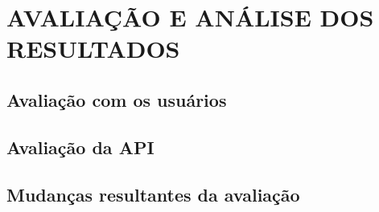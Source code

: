 \chapter{AVALIAÇÃO E ANÁLISE DOS RESULTADOS}
\label{chap:analise}

\section{Avaliação com os usuários}
\label{avaliacaousuarios}

\section{Avaliação da API}
\label{avaliacaoapi}


\section{Mudanças resultantes da avaliação}
\label{mudanasresultantes}